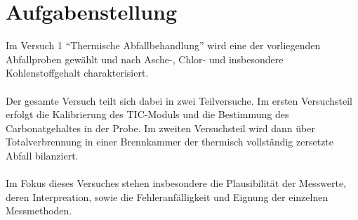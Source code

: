 \chapter{Aufgabenstellung}
\label{sec:aufgabenstellung}
Im Versuch 1 "`Thermische Abfallbehandlung"' wird eine der vorliegenden Abfallproben gewählt und nach Asche-, Chlor- und insbesondere Kohlenstoffgehalt charakterisiert. \\ \\
Der gesamte Versuch teilt sich dabei in zwei Teilversuche. Im ersten Versuchsteil erfolgt die Kalibrierung des TIC-Moduls und die Bestimmung des Carbonatgehaltes in der Probe. Im zweiten Versuchsteil wird dann über Totalverbrennung in einer Brennkammer der thermisch vollständig zersetzte Abfall bilanziert.\\ \\
Im Fokus dieses Versuches stehen insbesondere die Plausibilität der Messwerte, deren Interpreation, sowie die Fehleranfälligkeit und Eignung der einzelnen Messmethoden.
